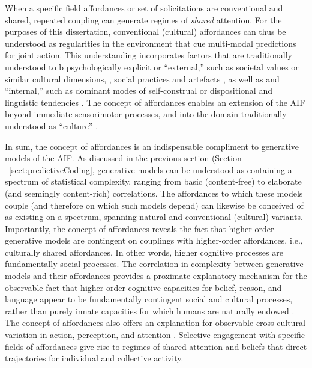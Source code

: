 \begin{CJK}{UTF8}{gbsn}
When a specific field affordances or set of solicitations are conventional and shared, repeated coupling can generate regimes of \textit{shared} attention. For the purposes of this dissertation, conventional (cultural) affordances can thus be understood as regularities in the environment that cue multi-modal predictions for joint action.  This understanding incorporates factors that are traditionally understood to b psychologically explicit or ``external,'' such as societal values or similar cultural dimensions, \citep{Hofstede1991,Schwartz1992}, social practices and artefacts  \citep{Nisbett2003a}, as well as and ``internal,'' such as dominant modes of self-construal or dispositional and linguistic tendencies \citep{Markus1991}.  The concept of affordances enables an extension of the AIF beyond immediate sensorimotor processes, and into the domain traditionally understood as ``culture'' \citep{Roepstorff2010}.

In sum, the concept of affordances is an indispensable compliment to generative models of the AIF.  As discussed in the previous section (Section ~\ref{sect:predictiveCoding}, generative models can be understood as containing a spectrum of statistical complexity, ranging from basic (content-free) to elaborate (and seemingly content-rich) correlations.  The affordances to which these models couple (and therefore on which such models depend) can likewise be conceived of as existing on a spectrum, spanning natural and conventional (cultural) variants.  Importantly, the concept of affordances reveals the fact that higher-order generative models are contingent on couplings with higher-order affordances, i.e., culturally shared affordances.  In other words, higher cognitive processes are fundamentally social processes.   The correlation in complexity between generative models and their affordances provides a proximate explanatory mechanism for the observable fact that higher-order cognitive capacities for belief, reason, and language appear to be fundamentally contingent social and cultural processes, rather than purely innate capacities for which humans are naturally endowed \citep{Sperber1997,Henrich2015}.  The concept of affordances also offers an explanation for observable cross-cultural variation in action, perception, and attention \citep[cf.][]{Nisbett2003}.  Selective engagement with specific fields of affordances give rise to regimes of shared attention and beliefs that direct trajectories for individual and collective activity.



\end{CJK}

